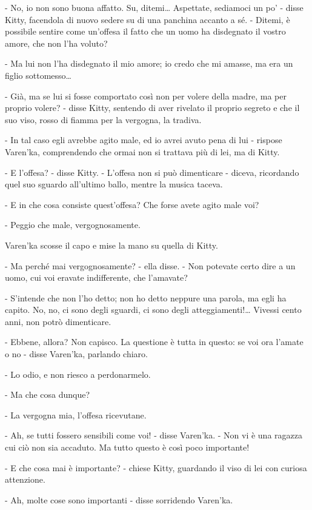 - No, io non sono buona affatto. Su, ditemi\ldots{} Aspettate, sediamoci un po' - disse Kitty, facendola di nuovo sedere su di una panchina accanto a sé. - Ditemi, è possibile sentire come un'offesa il fatto che un uomo ha disdegnato il vostro amore, che non l'ha voluto? 

- Ma lui non l'ha disdegnato il mio amore; io credo che mi amasse, ma era un figlio sottomesso\ldots{} 

- Già, ma se lui si fosse comportato così non per volere della madre, ma per proprio volere? - disse Kitty, sentendo di aver rivelato il proprio segreto e che il suo viso, rosso di fiamma per la vergogna, la tradiva. 

- In tal caso egli avrebbe agito male, ed io avrei avuto pena di lui - rispose Varen'ka, comprendendo che ormai non si trattava più di lei, ma di Kitty. 

- E l'offesa? - disse Kitty. - L'offesa non si può dimenticare - diceva, ricordando quel suo sguardo all'ultimo ballo, mentre la musica taceva. 

- E in che cosa consiste quest'offesa? Che forse avete agito male voi? 

- Peggio che male, vergognosamente. 

Varen'ka scosse il capo e mise la mano su quella di Kitty. 

- Ma perché mai vergognosamente? - ella disse. - Non potevate certo dire a un uomo, cui voi eravate indifferente, che l'amavate? 

- S'intende che non l'ho detto; non ho detto neppure una parola, ma egli ha capito. No, no, ci sono degli sguardi, ci sono degli atteggiamenti!\ldots{} Vivessi cento anni, non potrò dimenticare. 

- Ebbene, allora? Non capisco. La questione è tutta in questo: se voi ora l'amate o no - disse Varen'ka, parlando chiaro. 

- Lo odio, e non riesco a perdonarmelo. 

- Ma che cosa dunque? 

- La vergogna mia, l'offesa ricevutane. 

- Ah, se tutti fossero sensibili come voi! - disse Varen'ka. - Non vi è una ragazza cui ciò non sia accaduto. Ma tutto questo è così poco importante! 

- E che cosa mai è importante? - chiese Kitty, guardando il viso di lei con curiosa attenzione. 

- Ah, molte cose sono importanti - disse sorridendo Varen'ka. 

